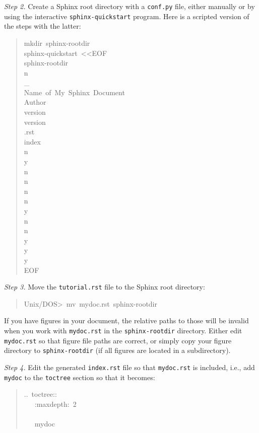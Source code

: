\documentclass[a4paper,english]{article}
\begin{document}
\emph{Step 2.} Create a Sphinx root directory with a \texttt{conf.py} file,
either manually or by using the interactive \texttt{sphinx-quickstart}
program. Here is a scripted version of the steps with the latter:
%
\begin{quote}{\ttfamily \raggedright \noindent
mkdir~sphinx-rootdir\\
sphinx-quickstart~<{}<EOF\\
sphinx-rootdir\\
n\\
\_\\
Name~of~My~Sphinx~Document\\
Author\\
version\\
version\\
.rst\\
index\\
n\\
y\\
n\\
n\\
n\\
n\\
y\\
n\\
n\\
y\\
y\\
y\\
EOF
}
\end{quote}

\emph{Step 3.} Move the \texttt{tutorial.rst} file to the Sphinx root directory:
%
\begin{quote}{\ttfamily \raggedright \noindent
Unix/DOS>~mv~mydoc.rst~sphinx-rootdir
}
\end{quote}

If you have figures in your document, the relative paths to those will
be invalid when you work with \texttt{mydoc.rst} in the \texttt{sphinx-rootdir}
directory. Either edit \texttt{mydoc.rst} so that figure file paths are correct,
or simply copy your figure directory to \texttt{sphinx-rootdir} (if all figures
are located in a subdirectory).

\emph{Step 4.} Edit the generated \texttt{index.rst} file so that \texttt{mydoc.rst}
is included, i.e., add \texttt{mydoc} to the \texttt{toctree} section so that it becomes:
%
\begin{quote}{\ttfamily \raggedright \noindent
..~toctree::\\
~~~:maxdepth:~2\\
~\\
~~~mydoc
}
\end{quote}
\end{document}
